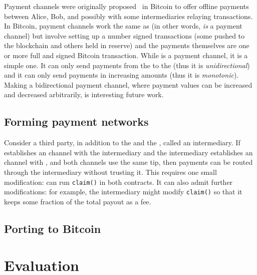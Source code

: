 Payment channels were originally proposed~\cite{DW15,PD15} in Bitcoin to offer offline payments between Alice, Bob, and possibly with some intermediaries relaying transactions. In Bitcoin, payment channels work the same as \ew (in other words, \ew \textit{is} a payment channel) but involve setting up a number signed transactions (some pushed to the blockchain and others held in reserve) and the payments themselves are one or more full and signed Bitcoin transaction. While \ew is a payment channel, it is a simple one. It can only send payments from the \make to the \take (thus it is \textit{unidirectional}) and it can only send payments in increasing amounts (thus it is \textit{monotonic}). Making a bidirectional payment channel, where payment values can be increased and decreased arbitrarily, is interesting future work.

\subsection{Forming payment networks} 

Consider a third party, in addition to the \make and the \take, called an intermediary. If \make establishes an \ew channel with the intermediary and the intermediary establishes an \ew channel with \take, and both channels use the same tip, then payments can be routed through the intermediary without trusting it. This requires one small modification: \take can run \texttt{claim()} in both contracts. It can also admit further modifications: for example, the intermediary might modify \texttt{claim()} so that it keeps some fraction of the total payout as a fee.

\subsection{Porting to Bitcoin}






\section{Evaluation}

